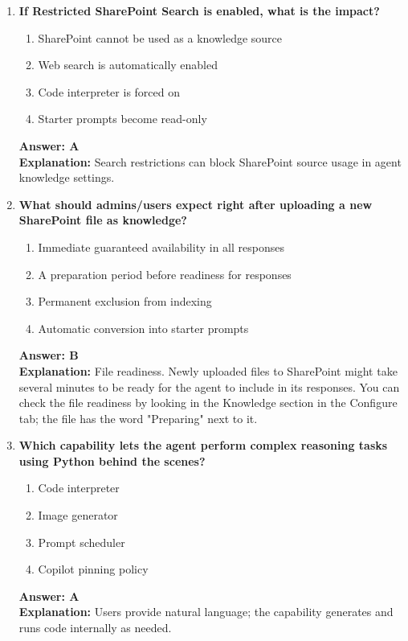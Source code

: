 \documentclass[10pt]{article}
\begin{document}
\begin{enumerate}[leftmargin=*]
\item \textbf{If Restricted SharePoint Search is enabled, what is the impact?}
\begin{enumerate}[label=\Alph*.]
  \item SharePoint cannot be used as a knowledge source
  \item Web search is automatically enabled
  \item Code interpreter is forced on
  \item Starter prompts become read-only
\end{enumerate}
\textbf{Answer: A}\\
\textbf{Explanation:} Search restrictions can block SharePoint source usage in agent knowledge settings.

\item \textbf{What should admins/users expect right after uploading a new SharePoint file as knowledge?}
\begin{enumerate}[label=\Alph*.]
  \item Immediate guaranteed availability in all responses
  \item A preparation period before readiness for responses
  \item Permanent exclusion from indexing
  \item Automatic conversion into starter prompts
\end{enumerate}
\textbf{Answer: B}\\
\textbf{Explanation:} File readiness. Newly uploaded files to SharePoint might take several minutes to be ready for the agent to include in its responses. You can check the file readiness by looking in the Knowledge section in the Configure tab; the file has the word "Preparing" next to it.

\item \textbf{Which capability lets the agent perform complex reasoning tasks using Python behind the scenes?}
\begin{enumerate}[label=\Alph*.]
  \item Code interpreter
  \item Image generator
  \item Prompt scheduler
  \item Copilot pinning policy
\end{enumerate}
\textbf{Answer: A}\\
\textbf{Explanation:} Users provide natural language; the capability generates and runs code internally as needed.


\end{enumerate}
\end{document}
